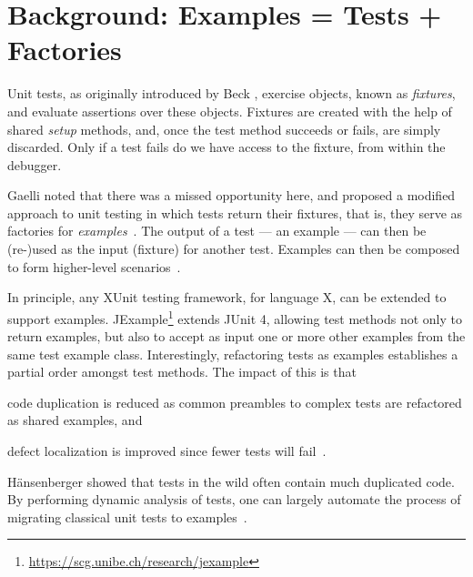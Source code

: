 \documentclass[sigplan,anonymous,review,10pt]{acmart}
\begin{document}
\maketitle


\section{Background: Examples = Tests + Factories}\label{sec:intro}

Unit tests, as originally introduced by Beck \cite{Beck94c}, exercise objects, known as \emph{fixtures}, and evaluate assertions over these objects.
Fixtures are created with the help of shared \emph{setup} methods, and, once the test method succeeds or fails, are simply discarded.
Only if a test fails do we have access to the fixture, from within the debugger.

Gaelli noted that there was a missed opportunity here, and proposed a modified approach to unit testing in which tests return their fixtures, that is, they serve as factories for \emph{examples}~\cite{Gael06b}.
The output of a test --- an example --- can then be (re-)used as the input (fixture) for another test.
Examples can then be composed to form higher-level scenarios~\cite{Gael07a}.

In principle, any XUnit testing framework, for language X, can be extended to support examples.
JExample\footnote{\url{https://scg.unibe.ch/research/jexample}} extends JUnit 4, allowing test methods not only to return examples, but also to accept as input one or more other examples from the same test example class.
Interestingly, refactoring tests as examples establishes a partial order amongst test methods.
The impact of this is that
\begin{inparaenum}[(i)]
	\item code duplication is reduced as common preambles to complex tests are refactored as shared examples, and
	\item defect localization is improved since fewer tests will fail~\cite{Kuhn08a}.
\end{inparaenum}
H{\"a}nsenberger showed that tests in the wild often contain much duplicated code.
By performing dynamic analysis of tests, one can largely automate the process of migrating classical unit tests to examples~\cite{Haen08b,Haen09a}.
\end{document}
